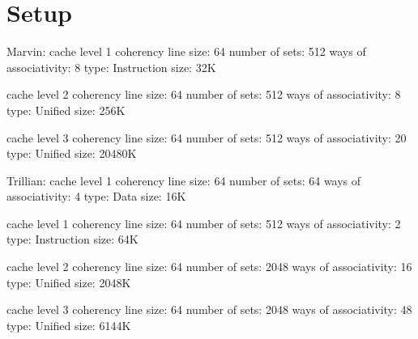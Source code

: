 \section{Setup}
Marvin:
cache level 1
coherency line size: 64
number of sets: 512
ways of associativity: 8
type: Instruction
size: 32K

cache level 2
coherency line size: 64
number of sets: 512
ways of associativity: 8
type: Unified
size: 256K

cache level 3
coherency line size: 64
number of sets: 512
ways of associativity: 20
type: Unified
size: 20480K


Trillian:
cache level 1
coherency line size: 64
number of sets: 64
ways of associativity: 4
type: Data
size: 16K

cache level 1
coherency line size: 64
number of sets: 512
ways of associativity: 2
type: Instruction
size: 64K

cache level 2
coherency line size: 64
number of sets: 2048
ways of associativity: 16
type: Unified
size: 2048K

cache level 3
coherency line size: 64
number of sets: 2048
ways of associativity: 48
type: Unified
size: 6144K